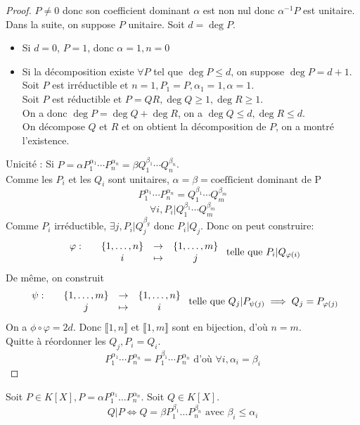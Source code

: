 \documentclass[]{report}
\begin{document}
    \begin{proof}
        $P\neq 0$ donc son coefficient dominant $\alpha$ est non nul donc $ \alpha^{-1}P$ est unitaire.\\
        Dans la suite, on suppose $P$ unitaire. Soit $d=\deg P$.
        \begin{itemize}
            \item Si $d=0$, $P=1$, donc $\alpha=1,n=0$
            \item Si la décomposition existe $\forall P$ tel que $\deg P\le d$, on suppose $\deg P=d+1$.\\
            Soit $P$ est irréductible et $n=1,P_1=P,\alpha_1=1,\alpha=1$.\\
            Soit $P$ est réductible et $P=QR,\deg Q\ge 1,\deg R\ge 1$.\\
            On a donc $\deg P=\deg Q+\deg R$, on a $\deg Q\le d, \deg R\le d.$\\
            On décompose $Q$ et $R$ et on obtient la décomposition de $P$, on a montré l'existence.\\
        \end{itemize}
        Unicité : Si $P=\alpha P_1^{\alpha_1}\cdots P_n^{\alpha_n}=\beta Q_1^{\beta_1}\cdots Q_n^{\beta_n}$.\\
        Comme les $P_i$ et les $Q_i$ sont unitaires, $\alpha=\beta=\text{coefficient dominant de P}$
        \[P_1^{\alpha_1}\cdots P_n^{\alpha_n}=Q_1^{\beta_1}\cdots Q_m^{\beta_m}\]
        \[\forall i, P_i|Q_1^{\beta_1}\cdots Q_m^{\beta_m}\]
        Comme $P_i$ irréductible, $\exists j,P_i|Q_j^{\beta_g}$ donc $P_i|Q_j$. Donc on peut construire:
        \[\begin{array}{ccccc} \varphi : & & \{1,\ldots,n\} & \to & \{1,\ldots,m\} \\ & & i & \mapsto & j \end{array}\text{ telle que }P_i|Q_{\varphi(i)}\]
        De même, on construit
        \[\begin{array}{ccccc} \psi : & & \{1,\ldots,m\} & \to & \{1,\ldots,n\} \\ & & j & \mapsto & i \end{array}\text{ telle que }Q_j|P_{\psi(j)}\implies Q_j=P_{\varphi(j)}\]
        On a $\phi \circ \varphi=2d$. Donc $\llbracket 1,n \rrbracket$ et $\llbracket 1,m \rrbracket$ sont en bijection, d'où $n=m$.\\
        Quitte à réordonner les $Q_j,P_i=Q_i$.
        \[P_1^{\alpha_1}\cdots P_n^{\alpha_n}=P_1^{\beta_1}\cdots P_n^{\alpha_n}\text{ d'où }\forall i, \alpha_i=\beta_i\]
    \end{proof}

    \begin{prop}{}{}
        Soit $P\in K[X],P=\alpha P_1^{\alpha_1}\dots P_n^{\alpha_n}$. Soit $Q\in K[X]$. 
        \[Q|P \iff Q=\beta P_1^{\beta_1}\dots P_n^{\beta_n} \text{ avec }\beta_i\le \alpha_i\]
    \end{prop}
\end{document}
